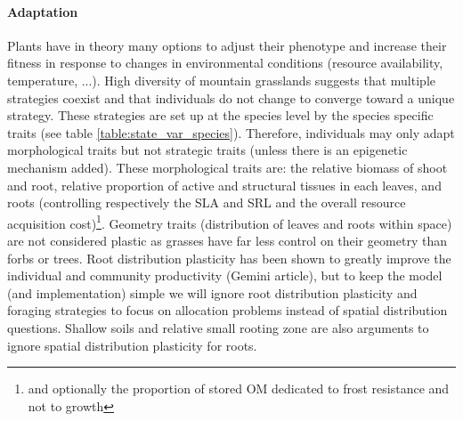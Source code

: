 \paragraph{Adaptation} Plants have in theory many options to adjust their phenotype and increase their fitness in response to changes in environmental conditions (resource availability, temperature, ...). High diversity of mountain grasslands suggests that multiple strategies coexist and that individuals do not change to converge toward a unique strategy. These strategies are set up at the species level by the species specific traits (see table \ref{table:state_var_species}). Therefore, individuals may only adapt morphological traits but not strategic traits (unless there is an epigenetic mechanism added). These morphological traits are: the relative biomass of shoot and root, relative proportion of active and structural tissues in each leaves, and roots (controlling respectively the SLA and SRL and the overall resource acquisition cost)\footnote{and optionally the proportion of stored OM dedicated to frost resistance and not to growth}. Geometry traits (distribution of leaves and roots within space) are not considered plastic as grasses have far less control on their geometry than forbs or trees. Root distribution plasticity has been shown to greatly improve the individual and community productivity (Gemini article), but to keep the model (and implementation) simple we will ignore root distribution plasticity and foraging strategies to focus on allocation problems instead of spatial distribution questions. Shallow soils and relative small rooting zone are also arguments to ignore spatial distribution plasticity for roots.

